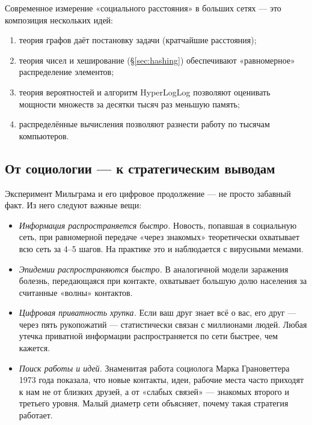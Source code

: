 \begin{importantbox}[title={Важно: краткое резюме}]
Современное измерение «социального расстояния» в больших сетях --- это композиция нескольких идей:
\begin{enumerate}
  \item теория графов даёт постановку задачи (кратчайшие расстояния);
  \item теория чисел и хеширование (§\ref{sec:hashing}) обеспечивают «равномерное» распределение элементов;
  \item теория вероятностей и алгоритм HyperLogLog позволяют оценивать мощности множеств за десятки тысяч раз меньшую память;
  \item распределённые вычисления позволяют разнести работу по тысячам компьютеров.
\end{enumerate}
\end{importantbox}

\subsection{От социологии --- к стратегическим выводам}

Эксперимент Мильграма и его цифровое продолжение --- не просто забавный факт. Из него следуют важные вещи:

\begin{itemize}
  \item \emph{Информация распространяется быстро.} Новость, попавшая в социальную сеть, при равномерной передаче «через знакомых» теоретически охватывает всю сеть за 4--5 шагов. На практике это и наблюдается с вирусными мемами.
  \item \emph{Эпидемии распространяются быстро.} В аналогичной модели заражения болезнь, передающаяся при контакте, охватывает большую долю населения за считанные «волны» контактов.
  \item \emph{Цифровая приватность хрупка.} Если ваш друг знает всё о вас, его друг --- через пять рукопожатий --- статистически связан с миллионами людей. Любая утечка приватной информации распространяется по сети быстрее, чем кажется.
  \item \emph{Поиск работы и идей.} Знаменитая работа социолога Марка Грановеттера 1973 года показала, что новые контакты, идеи, рабочие места часто приходят к нам не от близких друзей, а от «слабых связей» --- знакомых второго и третьего уровня. Малый диаметр сети объясняет, почему такая стратегия работает.
\end{itemize}

